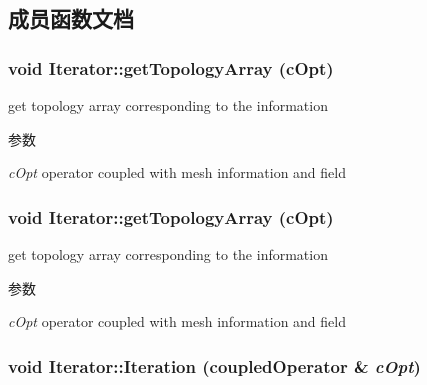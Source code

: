 \subsection{成员函数文档}
\hypertarget{classIterator_a51e761bd6eb92e306b30e1c1baadb394}{
\subsubsection[{getTopologyArray}]{\setlength{\rightskip}{0pt plus 5cm}void Iterator::getTopologyArray (cOpt)}}
\label{classIterator_a51e761bd6eb92e306b30e1c1baadb394}


get topology array corresponding to the information 
\begin{DoxyParams}{参数}
\item[{\em cOpt}]operator coupled with mesh information and field \end{DoxyParams}
\hypertarget{classIterator_a51e761bd6eb92e306b30e1c1baadb394}{
\subsubsection[{getTopologyArray}]{\setlength{\rightskip}{0pt plus 5cm}void Iterator::getTopologyArray (cOpt)}}
\label{classIterator_a51e761bd6eb92e306b30e1c1baadb394}


get topology array corresponding to the information 
\begin{DoxyParams}{参数}
\item[{\em cOpt}]operator coupled with mesh information and field \end{DoxyParams}
\hypertarget{classIterator_a6f5264776582089c8507dc3fc03a6113}{
\subsubsection[{Iteration}]{\setlength{\rightskip}{0pt plus 5cm}void Iterator::Iteration (coupledOperator \& {\em cOpt})}}
\label{classIterator_a6f5264776582089c8507dc3fc03a6113}


